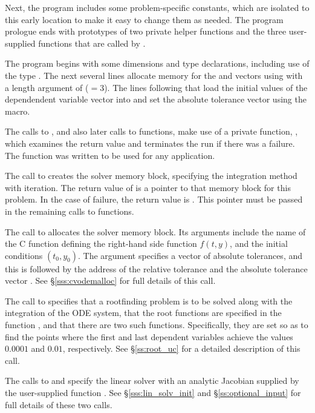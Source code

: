 Next, the program includes some problem-specific constants, which are
isolated to this early location to make it easy to change them as needed.  
The program prologue ends with prototypes of two private helper
functions and the three user-supplied functions that are called by {\cvode}.

The  program begins with some dimensions and type declarations,
including use of the type .  The next several lines
allocate memory for the  and  vectors using
 with a length argument of  ($= 3$). The
lines following that load the initial values of the dependendent
variable vector into  and set the absolute tolerance vector
 using the  macro.

The calls to , and also later calls to 
functions, make use of a private function, , which examines
the return value and terminates the run if there was a failure.  The
 function was written to be used for any 
application.

The call to  creates the {\cvode} solver memory block,
specifying the  integration method with  iteration.
The return value of is a pointer to that memory block for this
problem.  In the case of failure, the return value is .  This
pointer must be passed in the remaining calls to {\cvode} functions.

The call to  allocates the solver memory block.
Its arguments include the name of the C function  defining the
right-hand side function $f(t,y)$, and the initial conditions $(t_0,y_0)$.
The argument  specifies a vector of absolute tolerances, and
this is followed by the address of the relative tolerance 
and the absolute tolerance vector .
See \S\ref{sss:cvodemalloc} for full details of this call.

The call to  specifies that a rootfinding problem
is to be solved along with the integration of the ODE system, that the
root functions are specified in the function , and that there are
two such functions.  Specifically, they are set so as to find the points
where the first and last dependent variables achieve the values $0.0001$
 and $0.01$, respectively.
See \S\ref{ss:root_uc} for a detailed description of this call.

The calls to  and  specify the {\cvdense}
linear solver with an analytic Jacobian supplied by the user-supplied function
.  See \S\ref{sss:lin_solv_init} and \S\ref{ss:optional_input}
for full details of these two calls.


